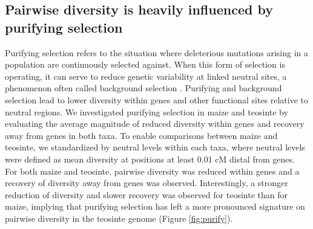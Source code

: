 \documentclass{pnastwo}
\newcommand{\jri}[1]{\textcolor{blue}{\emph{#1}} }
\begin{document}
\begin{article}

\subsection{Pairwise diversity is heavily influenced by purifying selection}
Purifying selection refers to the situation where deleterious mutations arising in a population are continuously selected against.
When this form of selection is operating, it can serve to reduce genetic variability at linked neutral sites, a phenomenon often called background selection \cite{charlesworth1993}. Purifying and background selection lead to lower diversity within genes and other functional sites relative to neutral regions.
We investigated purifying selection in maize and teosinte by evaluating the average magnitude of reduced diversity within genes and recovery away from genes in both taxa.
To enable comparisons between maize and teosinte, we standardized by neutral levels within each taxa, where neutral levels were defined as mean diversity at positions at least 0.01 cM distal from genes. For both maize and teosinte, pairwise diversity was reduced within genes and a recovery of diversity away from genes was observed. Interestingly, a stronger reduction of diversity and slower recovery was observed for teosinte than for maize, implying that purifying selection has left a more pronounced signature on pairwise diversity in the teosinte genome (Figure \ref{fig:purify}).




\end{article}
\end{document}

